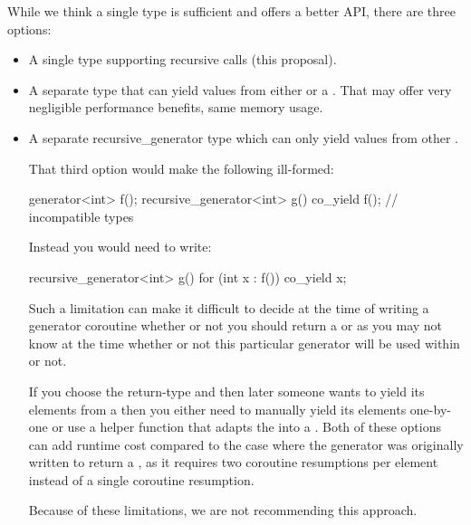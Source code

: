 \documentclass{wg21}
\begin{document}
While we think a single  type is sufficient and offers a better API, there are three options:

\begin{itemize}
    \item A single  type supporting recursive calls (this proposal).

    \item A separate type  that can yield values from either  or a . That may offer very negligible performance benefits, same memory usage.

    \item A separate {recursive_generator} type which can only yield values from other .

    That third option would make the following ill-formed:

    \begin{colorblock}
        generator<int> f();
        recursive_generator<int> g() {
            co_yield f(); // incompatible types
        }
    \end{colorblock}

    Instead you would need to write:
    \begin{colorblock}
        recursive_generator<int> g() {
            for (int x : f()) co_yield x;
        }
    \end{colorblock}

    Such a limitation can make it difficult to decide at the time of writing a generator
    coroutine whether or not you should return a  or 
    as you may not know at the time whether or not this particular generator will be used
    within  or not.

    If you choose the  return-type and then later someone wants to yield its
    elements from a  then you either need to manually yield its
    elements one-by-one or use a helper function that adapts the  into a
    . Both of these options can add runtime cost compared to the case where the generator was originally written to return a ,
    as it requires two coroutine resumptions per element instead of a single coroutine resumption.

    Because of these limitations, we are not recommending this approach.
\end{itemize}
\end{document}
